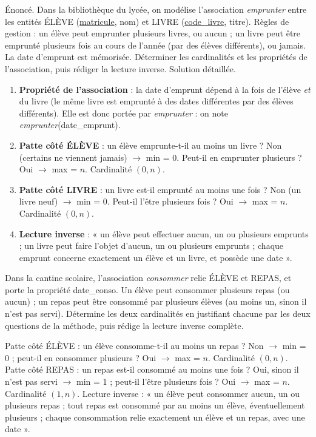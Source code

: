 \documentclass[11pt]{article}
\begin{document}
\begin{exoresolu}
Énoncé. Dans la bibliothèque du lycée, on modélise l'association \emph{emprunter} entre les entités ÉLÈVE (\underline{matricule}, nom) et LIVRE (\underline{code\_livre}, titre). Règles de gestion : un élève peut emprunter plusieurs livres, ou aucun ; un livre peut être emprunté plusieurs fois au cours de l'année (par des élèves différents), ou jamais. La date d'emprunt est mémorisée. Déterminer les cardinalités et les propriétés de l'association, puis rédiger la lecture inverse.
\tcblower
Solution détaillée.
\begin{enumerate}
\item \textbf{Propriété de l'association} : la date d'emprunt dépend à la fois de l'élève \emph{et} du livre (le même livre est emprunté à des dates différentes par des élèves différents). Elle est donc portée par \emph{emprunter} : on note \emph{emprunter}(date\_emprunt).
\item \textbf{Patte côté ÉLÈVE} : un élève emprunte-t-il au moins un livre ? Non (certains ne viennent jamais) $\rightarrow$ min = 0. Peut-il en emprunter plusieurs ? Oui $\rightarrow$ max = $n$. Cardinalité $(0,n)$.
\item \textbf{Patte côté LIVRE} : un livre est-il emprunté au moins une fois ? Non (un livre neuf) $\rightarrow$ min = 0. Peut-il l'être plusieurs fois ? Oui $\rightarrow$ max = $n$. Cardinalité $(0,n)$.
\item \textbf{Lecture inverse} : « un élève peut effectuer aucun, un ou plusieurs emprunts ; un livre peut faire l'objet d'aucun, un ou plusieurs emprunts ; chaque emprunt concerne exactement un élève et un livre, et possède une date ».
\end{enumerate}
\end{exoresolu}

\begin{exercice}
Dans la cantine scolaire, l'association \emph{consommer} relie ÉLÈVE et REPAS, et porte la propriété date\_conso. Un élève peut consommer plusieurs repas (ou aucun) ; un repas peut être consommé par plusieurs élèves (au moins un, sinon il n'est pas servi). Détermine les deux cardinalités en justifiant chacune par les deux questions de la méthode, puis rédige la lecture inverse complète.
\end{exercice}

\begin{corrige}
Patte côté ÉLÈVE : un élève consomme-t-il au moins un repas ? Non $\rightarrow$ min = 0 ; peut-il en consommer plusieurs ? Oui $\rightarrow$ max = $n$. Cardinalité $(0,n)$. Patte côté REPAS : un repas est-il consommé au moins une fois ? Oui, sinon il n'est pas servi $\rightarrow$ min = 1 ; peut-il l'être plusieurs fois ? Oui $\rightarrow$ max = $n$. Cardinalité $(1,n)$. Lecture inverse : « un élève peut consommer aucun, un ou plusieurs repas ; tout repas est consommé par au moins un élève, éventuellement plusieurs ; chaque consommation relie exactement un élève et un repas, avec une date ».
\end{corrige}
\end{document}
